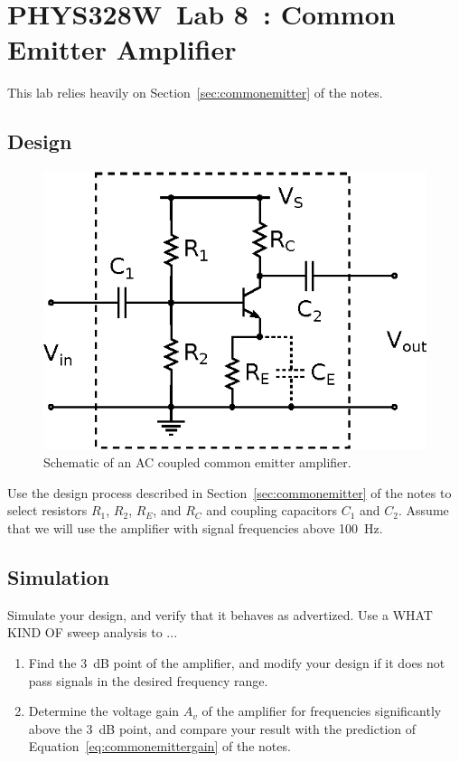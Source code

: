 \documentclass[11pt]{article}
\newcommand{\COURSE}{PHYS328W}
\newcommand{\LABNUM}{8}
\newcommand{\TITLE}{Common Emitter Amplifier}
\begin{document}
\thispagestyle{empty}

\section*{\COURSE\ Lab \LABNUM\ : \TITLE}

This lab relies heavily on Section~\ref{sec:commonemitter} of the notes.

\subsection*{Design}

\begin{figure}[ht]
  \begin{center}
    \includegraphics{commonemitter.eps}
    \caption{Schematic of an AC coupled common emitter amplifier.}
    \label{fig:commonemittercircuit}
  \end{center}
\end{figure}

Use the design process described in Section~\ref{sec:commonemitter} of
the notes to select resistors $R_1$, $R_2$, $R_E$, and $R_C$ and
coupling capacitors $C_1$ and $C_2$. Assume that we will use the
amplifier with signal frequencies above 100~Hz.

\subsection*{Simulation}

Simulate your design, and verify that it behaves as advertized. Use a
WHAT KIND OF sweep analysis to ...
\begin{enumerate}
\item Find the 3~dB point of the amplifier, and
  modify your design if it does not pass signals in the desired
  frequency range.

\item Determine the voltage gain $A_v$ of the amplifier for
  frequencies significantly above the 3~dB point, and compare your
  result with the prediction of Equation~\ref{eq:commonemittergain} of
  the notes.
\end{enumerate}
\end{document}
